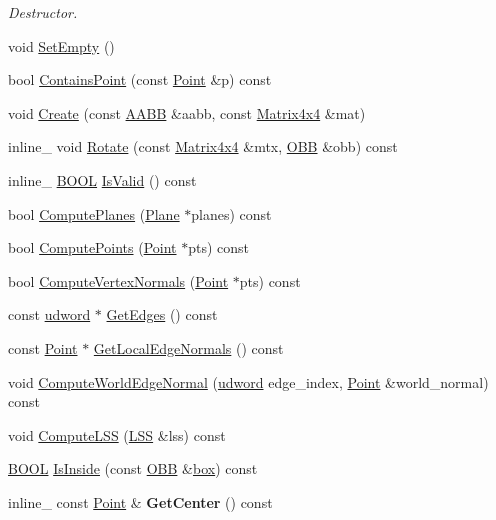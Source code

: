 \begin{DoxyCompactItemize}
\begin{DoxyCompactList}\small\item\em Destructor. \end{DoxyCompactList}\item 
void \hyperlink{class_o_b_b_a942af8b1f9fda0544de062a071c75204}{Set\+Empty} ()
\item 
bool \hyperlink{class_o_b_b_a509e791cfa67b4e168e33dc5db3674b8}{Contains\+Point} (const \hyperlink{class_point}{Point} \&p) const 
\item 
void \hyperlink{class_o_b_b_a86084565116d26baebe3ac3b7945000f}{Create} (const \hyperlink{class_a_a_b_b}{A\+A\+B\+B} \&aabb, const \hyperlink{class_matrix4x4}{Matrix4x4} \&mat)
\item 
inline\+\_\+ void \hyperlink{class_o_b_b_acf8fc783c04d70e3cdbc88a7a52d2eb0}{Rotate} (const \hyperlink{class_matrix4x4}{Matrix4x4} \&mtx, \hyperlink{class_o_b_b}{O\+B\+B} \&obb) const 
\item 
inline\+\_\+ \hyperlink{_ice_types_8h_a050c65e107f0c828f856a231f4b4e788}{B\+O\+O\+L} \hyperlink{class_o_b_b_a3bb702c4343f25d78dd7bec3a5359150}{Is\+Valid} () const 
\item 
bool \hyperlink{class_o_b_b_a4edd7fb37a2ecd2334bcdcace3cdcd08}{Compute\+Planes} (\hyperlink{class_plane}{Plane} $\ast$planes) const 
\item 
bool \hyperlink{class_o_b_b_ad9b5da33320f558b258c58726bcf4aed}{Compute\+Points} (\hyperlink{class_point}{Point} $\ast$pts) const 
\item 
bool \hyperlink{class_o_b_b_ac89ab861cbbfc1eb9a830d3dc6894d91}{Compute\+Vertex\+Normals} (\hyperlink{class_point}{Point} $\ast$pts) const 
\item 
const \hyperlink{_ice_types_8h_a44c6f1920ba5551225fb534f9d1a1733}{udword} $\ast$ \hyperlink{class_o_b_b_a3cb304bdb9371054780c97d29f695686}{Get\+Edges} () const 
\item 
const \hyperlink{class_point}{Point} $\ast$ \hyperlink{class_o_b_b_a71d63f343a1482d1f2227e2077c90192}{Get\+Local\+Edge\+Normals} () const 
\item 
void \hyperlink{class_o_b_b_a6e8844c4d4b064a2cfbd142589af22a2}{Compute\+World\+Edge\+Normal} (\hyperlink{_ice_types_8h_a44c6f1920ba5551225fb534f9d1a1733}{udword} edge\+\_\+index, \hyperlink{class_point}{Point} \&world\+\_\+normal) const 
\item 
void \hyperlink{class_o_b_b_ad94c92759c88eead1a8eab29896f6b6e}{Compute\+L\+S\+S} (\hyperlink{class_l_s_s}{L\+S\+S} \&lss) const 
\item 
\hyperlink{_ice_types_8h_a050c65e107f0c828f856a231f4b4e788}{B\+O\+O\+L} \hyperlink{class_o_b_b_af6e44c90fd7bfa6697b3a8e47fdd2517}{Is\+Inside} (const \hyperlink{class_o_b_b}{O\+B\+B} \&\hyperlink{structbox}{box}) const 
\item 
\hypertarget{class_o_b_b_a4d6d888b732b7764e58b73cba83e77f4}{inline\+\_\+ const \hyperlink{class_point}{Point} \& {\bfseries Get\+Center} () const }\label{class_o_b_b_a4d6d888b732b7764e58b73cba83e77f4}


\end{DoxyCompactItemize}
